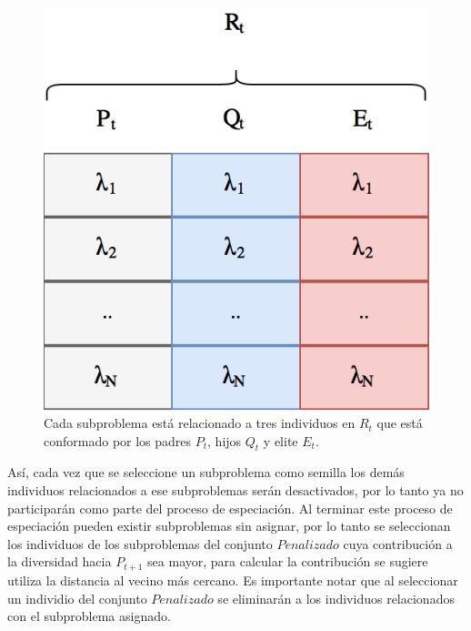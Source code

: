 \begin{figure}[]
\centering
\scriptsize
\includegraphics[scale=0.3]
{Figures_Chapter4/Related_Populations.png}
\decoRule
\caption{Cada subproblema está relacionado a tres individuos en $R_t$ que está conformado por los padres $P_t$, hijos $Q_t$ y elite $E_t$.}
\label{fig:subproblems_populations}
\end{figure}


Así, cada vez que se seleccione un subproblema como semilla los demás individuos relacionados a ese subproblemas serán desactivados, por lo tanto ya no participarán como parte del proceso de especiación.
%
Al terminar este proceso de especiación pueden existir subproblemas sin asignar, por lo tanto se seleccionan los individuos de los subproblemas del conjunto $Penalizado$ cuya contribución a la diversidad hacia $P_{t+1}$ sea mayor, para calcular la contribución se sugiere utiliza la distancia al vecino más cercano.
%
Es importante notar que al seleccionar un individio del conjunto $Penalizado$ se eliminarán a los individuos relacionados con el subproblema asignado.

